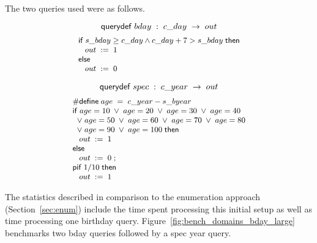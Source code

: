 The two queries used were as follows.

$$ \squerydefk \; bday \; : \;c\text{\_}day \; \ra \; out$$
\begin{displaymath}{\small
\begin{array}{l}
  \sifk \; \ebinop{\wedge}{\ebinop{\geq}{s\text{\_}bday}{c\text{\_}day}}{\ebinop{>}{\ebinop{+}{c\text{\_}day}{7}}{s\text{\_}bday}} \; \sthenk\\
  \;\;\;\sassign{out}{1}\\
  \selsek\\
  \;\;\;\sassign{out}{0}\\
\end{array}
}\end{displaymath}

$$ \squerydefk \; spec \; : \;c\text{\_}year \; \ra \; out$$
\begin{displaymath}{\small
\begin{array}{l}
  \psdefine{age}{\ebinop{-}{c\text{\_}year}{s\text{\_}byear}}\\
  \sifk \; \lbinop{\vee}{\lbinop{\vee}{\lbinop{\vee}{\lbinop{\vee}{\lbinop{\vee}{\lbinop{\vee}{\lbinop{\vee}{\lbinop{\vee}{\lbinop{\vee}{\lreln{=}{age}{10}}{\lreln{=}{age}{20}}}{\lreln{=}{age}{30}}}{\lreln{=}{age}{40}}\\\;}{\lreln{=}{age}{50}}}{\lreln{=}{age}{60}}}{\lreln{=}{age}{70}}}{\lreln{=}{age}{80}}\\\;}{\lreln{=}{age}{90}}}{\lreln{=}{age}{100}}\; \sthenk\\
  \;\;\;\sassign{out}{1}\\
  \selsek\\
  \;\;\;\sassign{out}{0}\; ;\\
  \spifk\; 1/10 \; \sthenk\\
  \;\;\;\sassign{out}{1}\\
\end{array}
}
\end{displaymath}

The statistics described in comparison to the enumeration approach
(Section~\ref{sec:enum}) include the time spent processing this
initial setup as well as time processing one birthday
query. Figure~\ref{fig:bench_domains_bday_large} benchmarks two bday
queries followed by a spec year query.

